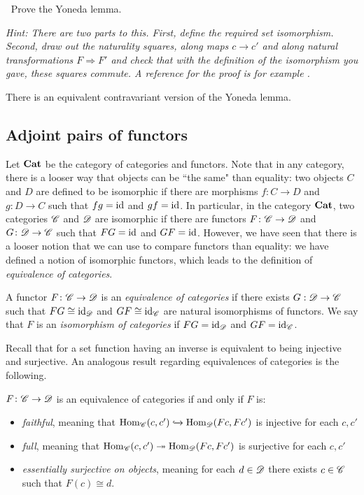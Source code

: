\documentclass{article}[11pt]
\begin{document}
\begin{exercise} $\ $
Prove the Yoneda lemma.

\emph{Hint: There are two parts to this. First, define the required set isomorphism. Second, draw out the naturality squares, along maps $c\to c'$ and along natural transformations $F\Rightarrow F'$ and check that with the definition  of the isomorphism you gave, these squares commute.  A reference for the proof is for example \cite[Lemma 2.5]{mehrle}.}
\end{exercise}
There is an equivalent contravariant version of the Yoneda lemma.

\subsection{Adjoint pairs of functors}

Let $\textbf{Cat}$ be the category of categories and functors. Note that in any category, there is a looser way that objects can be ``the same" than equality: two objects $C$ and $D$ are defined to be isomorphic if there are morphisms $f\colon C\to D$ and $g\colon D\to C$ such that $fg=\text{id}$ and $gf=\text{id}$. In particular, in the category $\textbf{Cat}$, two categories $\mathscr{C}$ and $\mathscr{D}$ are isomorphic if there are functors $F\colon \mathscr{C}\to \mathscr{D}$ and $G\colon \mathscr{D}\to \mathscr{C}$ such that $FG=\text{id}$ and $GF=\text{id}$. However, we have seen that there is a looser notion that we can use to compare functors than equality: we have defined a notion of isomorphic functors, which leads to the definition of \emph{equivalence of categories}.

\begin{definition}\label{equivcats} A functor $F\colon \mathscr{C} \to \mathscr{D}$ is an \textit{equivalence of categories} if there exists $G : \mathscr{D} \to \mathscr{C}$ such that $FG \cong \text{id}_{\mathscr{D}}$ and $GF\cong \text{id}_{\mathscr{C}}$ are natural isomorphisms of functors. We say that $F$ is an \textit{isomorphism of categories} if $FG = \text{id}_{\mathscr{D}}$ and $GF = \text{id}_{\mathscr{C}}$.
\end{definition}

Recall that for a set function having an inverse is equivalent to being injective and surjective. An analogous result regarding equivalences of categories is the following.

\begin{proposition} $F\colon \mathscr{C} \to \mathscr{D}$ is an equivalence of categories if and only if $F$ is:
\vspace{-1em}
\begin{itemize}\itemsep0em
	\item \textit{faithful}, meaning that $\textup{Hom}_{\mathscr{C}}(c,c') \xhookrightarrow{} \textup{Hom}_{\mathscr{D}}(Fc, Fc')$ is injective for each $c,c'$
	\item \textit{full}, meaning that $\textup{Hom}_{\mathscr{C}}(c,c') \twoheadrightarrow \textup{Hom}_{\mathscr{D}}(Fc,Fc')$ is surjective for each $c,c'$
	\item \textit{essentially surjective on objects}, meaning for each $d\in \mathscr{D}$ there exists $c\in \mathscr{C}$ such that $F(c) \cong d$.
\end{itemize}
\end{proposition}
\end{document}
